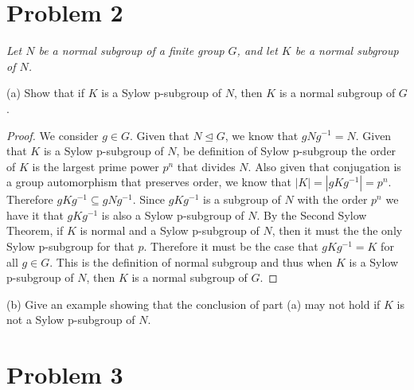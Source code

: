 \documentclass{article}
\theoremstyle{plain} %
\theoremstyle{definition} %
\begin{document}
\section*{Problem 2}
\noindent \textit{Let $N$ be a normal subgroup of a finite group $G$, and let
$K$ be a normal subgroup of $N$.}

\noindent (a) Show that if $K$ is a Sylow p-subgroup of $N$, then $K$ is a normal subgroup of $G$.
\begin{proof}
    We consider $g \in G$. Given that $N \trianglelefteq G$, we know that $gNg^{-1} = N$. Given that $K$ is a Sylow p-subgroup
    of $N$, be definition of Sylow p-subgroup the order of $K$ is the largest prime power $p^n$ that divides $N$. Also given
    that conjugation is a group automorphism that preserves order, we know that $|K| = |gKg^{-1}| = p^n$. Therefore $gKg^{-1} \subseteq
    gNg^{-1}$. Since $gKg^{-1}$ is a subgroup of $N$ with the order $p^n$ we have it that $gKg^{-1}$ is also a Sylow p-subgroup of $N$. By
    the Second Sylow Theorem, if $K$ is normal and a Sylow p-subgroup of $N$, then it must the the only Sylow p-subgroup for that $p$. Therefore
    it must be the case that $gKg^{-1} = K$ for all $g \in G$. This is the definition of normal subgroup and thus when $K$ is a Sylow p-subgroup of $N$, then $K$
    is a normal subgroup of $G$.
\end{proof}

\noindent (b) Give an example showing that the conclusion of part (a) may not hold if $K$ is not a Sylow p-subgroup of $N$.

\section*{Problem 3}
\end{document}
